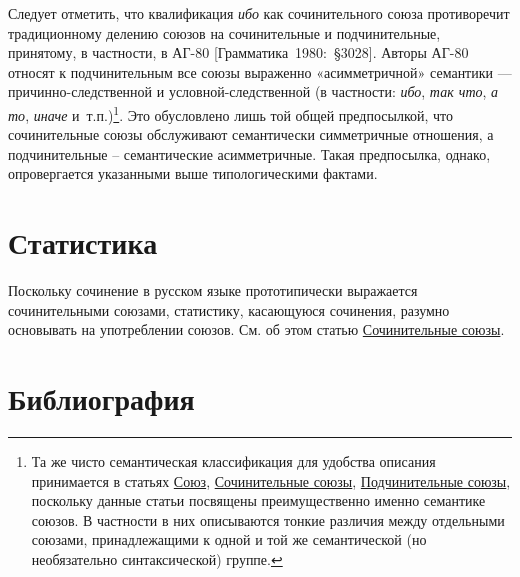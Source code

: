 Следует отметить, что квалификация \textit{ибо} как сочинительного союза
противоречит традиционному делению союзов на сочинительные и
подчинительные, принятому, в частности, в АГ-80
{[}Грамматика~1980:~§3028{]}. Авторы АГ-80 относят к подчинительным все
союзы выраженно «асимметричной» семантики --- причинно-следственной и
условной-следственной (в частности: \textit{ибо}, \textit{так что}, \textit{а
  то}, \textit{иначе} и~т.п.)\footnote{Та же чисто семантическая
  классификация для удобства описания принимается в статьях
  \underline{Союз}, \underline{Сочинительные союзы},
  \underline{Подчинительные союзы}, поскольку данные статьи посвящены
  преимущественно именно семантике союзов. В частности в них описываются
  тонкие различия между отдельными союзами, принадлежащими к одной и той
  же семантической (но необязательно синтаксической) группе.}. Это
обусловлено лишь той общей предпосылкой, что сочинительные союзы
обслуживают семантически симметричные отношения, а подчинительные --
семантические асимметричные. Такая предпосылка, однако, опровергается
указанными выше типологическими фактами.

\section{Статистика}\label{ux441ux442ux430ux442ux438ux441ux442ux438ux43aux430}

Поскольку сочинение в русском языке прототипически выражается
сочинительными союзами, статистику, касающуюся сочинения, разумно
основывать на употреблении союзов. См. об этом статью
\underline{Сочинительные союзы}.

\section*{Библиография}\label{ux431ux438ux431ux43bux438ux43eux433ux440ux430ux444ux438ux44f}

